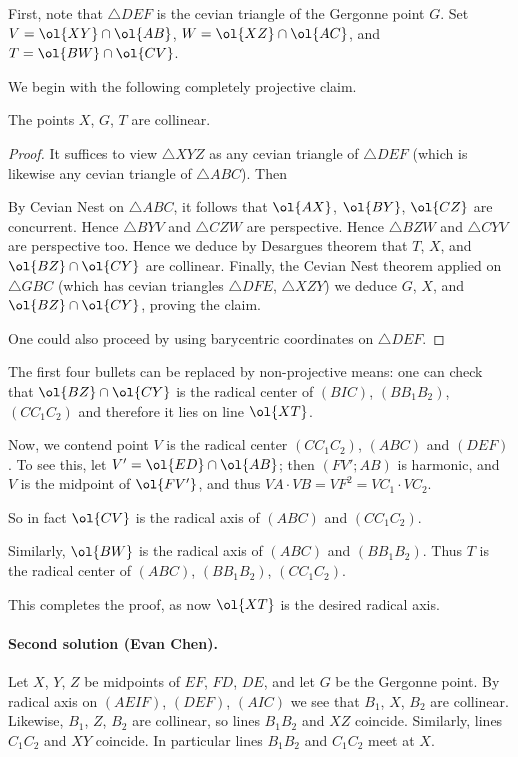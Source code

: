 \documentclass[11pt]{scrartcl}
\begin{document}
First, note that $\triangle DEF$ is the cevian triangle
of the Gergonne point $G$.
Set $V = \ol{XY} \cap \ol{AB}$, $W = \ol{XZ} \cap \ol{AC}$,
and $T = \ol{BW} \cap \ol{CV}$.

We begin with the following completely projective claim.
\begin{claim*}
  The points $X$, $G$, $T$ are collinear.
\end{claim*}
\begin{proof}
  It suffices to view $\triangle XYZ$ as any
  cevian triangle of $\triangle DEF$
  (which is likewise any cevian triangle of $\triangle ABC$).
  Then
  \begin{itemize}
    \ii By Cevian Nest on $\triangle ABC$,
    it follows that $\ol{AX}$, $\ol{BY}$, $\ol{CZ}$ are concurrent.
    \ii Hence $\triangle BYV$ and $\triangle CZW$ are perspective.
    \ii Hence $\triangle BZW$ and $\triangle CYV$ are perspective too.
    \ii Hence we deduce by Desargues theorem that $T$, $X$,
    and $\ol{BZ} \cap \ol{CY}$ are collinear.
    \ii Finally, the Cevian Nest theorem applied on $\triangle GBC$
    (which has cevian triangles $\triangle DFE$, $\triangle XZY$)
    we deduce $G$, $X$, and $\ol{BZ} \cap \ol{CY}$, proving the claim.
  \end{itemize}
  One could also proceed by using
  barycentric coordinates on $\triangle DEF$.
\end{proof}
\begin{remark*}
  The first four bullets can be replaced
  by non-projective means:
  one can check that $\ol{BZ} \cap \ol{CY}$ is the radical center
  of $(BIC)$, $(BB_1B_2)$, $(CC_1C_2)$
  and therefore it lies on line $\ol{XT}$.
\end{remark*}


Now, we contend point $V$ is the radical center $(CC_1C_2)$, $(ABC)$ and $(DEF)$.
To see this, let $V' = \ol{ED} \cap \ol{AB}$;
then $(FV';AB)$ is harmonic, and $V$ is the midpoint of $\ol{FV'}$,
and thus $VA \cdot VB = VF^2 = VC_1 \cdot VC_2$.

So in fact $\ol{CV}$ is the radical axis of $(ABC)$ and $(CC_1C_2)$.

Similarly, $\ol{BW}$ is the radical axis of $(ABC)$ and $(BB_1B_2)$.
Thus $T$ is the radical center of
$(ABC)$, $(BB_1B_2)$, $(CC_1C_2)$.

This completes the proof, as now $\ol{XT}$ is the desired radical axis.

\paragraph{Second solution (Evan Chen).}
Let $X$, $Y$, $Z$ be midpoints of $EF$, $FD$, $DE$,
and let $G$ be the Gergonne point.
By radical axis on $(AEIF)$, $(DEF)$, $(AIC)$
we see that $B_1$, $X$, $B_2$ are collinear.
Likewise, $B_1$, $Z$, $B_2$ are collinear,
so lines $B_1B_2$ and $XZ$ coincide.
Similarly, lines $C_1C_2$ and $XY$ coincide.
In particular lines $B_1B_2$ and $C_1C_2$ meet at $X$.
\end{document}
